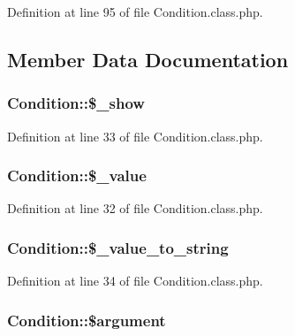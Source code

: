 Definition at line 95 of file Condition.\+class.\+php.



\subsection{Member Data Documentation}
\subsubsection[{\texorpdfstring{\$\+\_\+show}{$_show}}]{\setlength{\rightskip}{0pt plus 5cm}Condition\+::\$\+\_\+show}\hypertarget{classCondition_ae631b5f7e9a50ca781bd034edaf5e059}{}\label{classCondition_ae631b5f7e9a50ca781bd034edaf5e059}


Definition at line 33 of file Condition.\+class.\+php.

\subsubsection[{\texorpdfstring{\$\+\_\+value}{$_value}}]{\setlength{\rightskip}{0pt plus 5cm}Condition\+::\$\+\_\+value}\hypertarget{classCondition_af8fed5d1250eb545d782e80478dac4fe}{}\label{classCondition_af8fed5d1250eb545d782e80478dac4fe}


Definition at line 32 of file Condition.\+class.\+php.

\subsubsection[{\texorpdfstring{\$\+\_\+value\+\_\+to\+\_\+string}{$_value_to_string}}]{\setlength{\rightskip}{0pt plus 5cm}Condition\+::\$\+\_\+value\+\_\+to\+\_\+string}\hypertarget{classCondition_afcfd7fce951a699f3b065e227dbbacc9}{}\label{classCondition_afcfd7fce951a699f3b065e227dbbacc9}


Definition at line 34 of file Condition.\+class.\+php.

\subsubsection[{\texorpdfstring{\$argument}{$argument}}]{\setlength{\rightskip}{0pt plus 5cm}Condition\+::\$argument}\hypertarget{classCondition_ab2171308c722d4d35f37369762d78175}{}\label{classCondition_ab2171308c722d4d35f37369762d78175}


